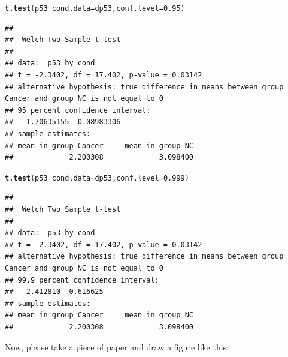\documentclass[a4paper,11pt]{article}\usepackage[]{graphicx}\usepackage[]{xcolor}
\makeatletter
\newcommand{\hlnum}[1]{\textcolor[rgb]{0.686,0.059,0.569}{#1}}%
\newcommand{\hlopt}[1]{\textcolor[rgb]{0,0,0}{#1}}%
\newcommand{\hldef}[1]{\textcolor[rgb]{0.345,0.345,0.345}{#1}}%
\newcommand{\hlkwc}[1]{\textcolor[rgb]{0.333,0.667,0.333}{#1}}%
\newcommand{\hlkwd}[1]{\textcolor[rgb]{0.737,0.353,0.396}{\textbf{#1}}}%
\newenvironment{kframe}{%
 \def\at@end@of@kframe{}%
 \ifinner\ifhmode%
  \def\at@end@of@kframe{\end{minipage}}%
  \begin{minipage}{\columnwidth}%
 \fi\fi%
 \def\FrameCommand##1{\hskip\@totalleftmargin \hskip-\fboxsep
 \colorbox{shadecolor}{##1}\hskip-\fboxsep
     \hskip-\linewidth \hskip-\@totalleftmargin \hskip\columnwidth}%
 \MakeFramed {\advance\hsize-\width
   \@totalleftmargin\z@ \linewidth\hsize
   \@setminipage}}%
 {\par\unskip\endMakeFramed%
 \at@end@of@kframe}
\newenvironment{knitrout}{}{} %
\numberwithin{exercise}{section}
\makeatother
\begin{document}
\begin{knitrout}
\color{fgcolor}\begin{kframe}
\begin{alltt}
\hlkwd{t.test}\hldef{(p53} \hlopt{~} \hldef{cond,} \hlkwc{data} \hldef{= dp53,} \hlkwc{conf.level} \hldef{=} \hlnum{0.95}\hldef{)}
\end{alltt}
\begin{verbatim}
## 
## 	Welch Two Sample t-test
## 
## data:  p53 by cond
## t = -2.3402, df = 17.402, p-value = 0.03142
## alternative hypothesis: true difference in means between group Cancer and group NC is not equal to 0
## 95 percent confidence interval:
##  -1.70635155 -0.08983306
## sample estimates:
## mean in group Cancer     mean in group NC 
##             2.200308             3.098400
\end{verbatim}
\end{kframe}
\end{knitrout}


\begin{knitrout}
\color{fgcolor}\begin{kframe}
\begin{alltt}
\hlkwd{t.test}\hldef{(p53} \hlopt{~} \hldef{cond,} \hlkwc{data} \hldef{= dp53,} \hlkwc{conf.level} \hldef{=} \hlnum{0.999}\hldef{)}
\end{alltt}
\begin{verbatim}
## 
## 	Welch Two Sample t-test
## 
## data:  p53 by cond
## t = -2.3402, df = 17.402, p-value = 0.03142
## alternative hypothesis: true difference in means between group Cancer and group NC is not equal to 0
## 99.9 percent confidence interval:
##  -2.412810  0.616625
## sample estimates:
## mean in group Cancer     mean in group NC 
##             2.200308             3.098400
\end{verbatim}
\end{kframe}
\end{knitrout}


Now, please take a piece of paper and draw a figure like this:
\end{document}
